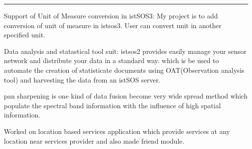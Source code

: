 
\noindent\rule{12.5cm}{0.4pt}

\vspace{0.2cm}
 
\noindent
\hspace{5em}%
\begin{minipage}{0.85\textwidth\vspace{2pt}}
    Support of Unit of Measure conversion in istSOS3: My project is to add conversion of
    unit of measure in istsos3. User can convert unit in another specified unit.
\end{minipage}
\sectionsep

 
\noindent
\hspace{5em}%
\begin{minipage}{0.85\textwidth\vspace{2pt}}
    Data analysis and statastical tool suit: istsos2 provides easily manage your sensor network
    and distribute your data in a standard way. which is be used to automate the creation of statisticate
    documents using OAT(Observation analysis tool) and harvesting the data from an istSOS server.
\end{minipage}
\sectionsep

 
\noindent
\hspace{5em}%
\begin{minipage}{0.85\textwidth\vspace{2pt}}
    pan sharpening is one kind of data fusion become very wide spread method which populate the spectral band information with the influence of high spatial information.
\end{minipage}
\sectionsep

 
\noindent
\hspace{5em}%
\begin{minipage}{0.85\textwidth\vspace{2pt}}
    Worked on location based services application which provide services at any location near
    services provider and also made friend module.
\end{minipage}
